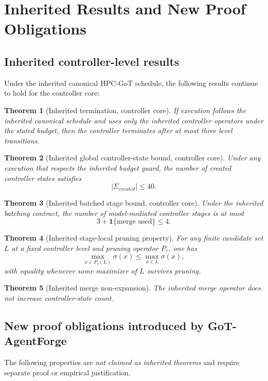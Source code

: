 \documentclass[11pt,a4paper,oneside]{article}
\newtheorem{theorem}{Theorem}[section]
\begin{document}
\section{Inherited Results and New Proof Obligations}
\subsection{Inherited controller-level results}
Under the inherited canonical HPC-GoT schedule, the following results continue to hold for the controller core:
\begin{theorem}[Inherited termination, controller core]
If execution follows the inherited canonical schedule and uses only the inherited controller operators under the stated budget, then the controller terminates after at most three level transitions.
\end{theorem}

\begin{theorem}[Inherited global controller-state bound, controller core]
Under any execution that respects the inherited budget guard, the number of created controller states satisfies
\[
|\Sigma_{created}| \le 40.
\]
\end{theorem}

\begin{theorem}[Inherited batched stage bound, controller core]
Under the inherited batching contract, the number of model-mediated controller stages is at most
\[
3 + \mathbf{1}\{\text{merge used}\} \le 4.
\]
\end{theorem}

\begin{theorem}[Inherited stage-local pruning property]
For any finite candidate set $L$ at a fixed controller level and pruning operator $P_\tau$, one has
\[
\max_{x\in P_\tau(L)} \sigma(x) \le \max_{x\in L} \sigma(x),
\]
with equality whenever some maximizer of $L$ survives pruning.
\end{theorem}

\begin{theorem}[Inherited merge non-expansion]
The inherited merge operator does not increase controller-state count.
\end{theorem}

\subsection{New proof obligations introduced by GoT-AgentForge}
The following properties are \emph{not claimed as inherited theorems} and require separate proof or empirical justification.
\end{document}

